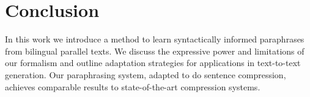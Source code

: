 \documentclass[11pt]{article}
\begin{document}
\section{Conclusion} \label{conclusion}

In this work we introduce a method to learn syntactically informed
paraphrases from bilingual parallel texts. We discuss the expressive
power and limitations of our formalism and outline adaptation
strategies for applications in text-to-text generation. Our
paraphrasing system, adapted to do sentence compression, achieves
comparable results to state-of-the-art compression systems.




\end{document}
